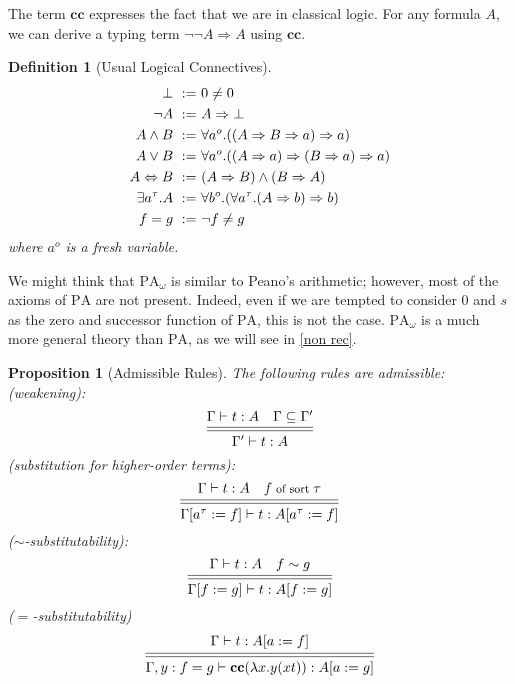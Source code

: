 \documentclass[a4paper,12pt]{article}
\newtheorem{prop}[theo]{Proposition}
\newtheorem{defi}[theo]{Definition}
\theoremstyle{rmqstyle}
\newcommand{\PA}{\mathrm{PA}}
\renewcommand{\implies}{\Rightarrow}
\renewcommand{\iff}{\Leftrightarrow}
\newcommand{\cc}{\mathbf{cc}}
\begin{document}
The term $\cc$ expresses the fact that we are in classical logic. For any formula $A$, we can derive a typing term $\neg \neg A \implies A$ using $\cc$.

\begin{defi}[Usual Logical Connectives]
\begin{align*}
\setlength\itemsep{ -1 em}
\bot \ :=& \ 0 \neq 0 \\
\neg A \ :=& \ A \implies \bot \\
A \land B \ :=& \ \forall a^o.((A \implies B \implies a) \implies a)\\
A \lor B \ :=& \ \forall a^o.((A \implies a) \implies (B \implies a) \implies a)\\
A \iff B \ :=& \ (A \implies B) \land (B \implies A)\\
\exists a^\tau. A \ :=& \ \forall b^o.(\forall a^\tau. (A \implies b) \implies b)\\
f = g \ :=& \ \neg f \neq g
\end{align*}
where $a^o$ is a fresh variable.
\end{defi}

We might think that $\PA_\omega$ is similar to Peano's arithmetic; however, most of the axioms of $\PA$ are not present. Indeed, even if we are tempted to consider $0$ and $s$ as the zero and successor function of $\PA$, this is not the case. $\PA_\omega$ is a much more general theory than $\PA$, as we will see in \ref{non rec}.

\begin{prop}[Admissible Rules]
The following rules are admissible:\\
(weakening):
$$ 
\begin{prooftree}[center=false]
\hypo{\Gamma \vdash t : A \quad \Gamma \subseteq \Gamma'}
\infer[double]1{\Gamma' \vdash t : A}
\end{prooftree}
$$
(substitution for higher-order terms):
$$
\begin{prooftree}[center=false]
\hypo{\Gamma \vdash t : A \quad {\footnotesize f \text{ of sort } \tau}}
\infer[double]1{\Gamma[a^\tau := f] \vdash t : A[a^\tau := f]}
\end{prooftree}
$$
($\sim$-substitutability):
$$
\begin{prooftree}[center=false]
\hypo{\Gamma \vdash t : A \quad f \sim g}
\infer[double]1{\Gamma[f := g] \vdash t : A[f := g]}
\end{prooftree}
$$
($=$-substitutability)
$$
\begin{prooftree}[center=false]
\hypo{\Gamma \vdash t : A[a := f]}
\infer[double]1{\Gamma, y : f = g \vdash \cc(\lambda x. y(xt)) : A[a := g]}
\end{prooftree}
$$
\end{prop}
\end{document}
